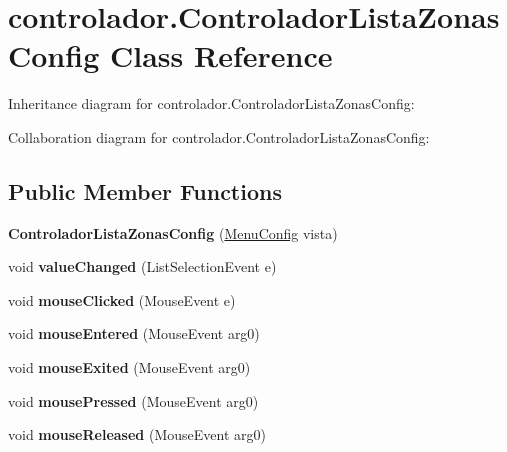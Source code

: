 \hypertarget{classcontrolador_1_1_controlador_lista_zonas_config}{}\section{controlador.\+Controlador\+Lista\+Zonas\+Config Class Reference}
\label{classcontrolador_1_1_controlador_lista_zonas_config}


Inheritance diagram for controlador.\+Controlador\+Lista\+Zonas\+Config\+:


Collaboration diagram for controlador.\+Controlador\+Lista\+Zonas\+Config\+:
\subsection*{Public Member Functions}
\begin{DoxyCompactItemize}
\item 
\mbox{\label{classcontrolador_1_1_controlador_lista_zonas_config_acfb911e40132c6189327faa9245c65d1}} 
{\bfseries Controlador\+Lista\+Zonas\+Config} (\mbox{\hyperlink{classvista_1_1_menu_config}{Menu\+Config}} vista)
\item 
\mbox{\label{classcontrolador_1_1_controlador_lista_zonas_config_a287715d558e3480db8c1e8d44dffadc1}} 
void {\bfseries value\+Changed} (List\+Selection\+Event e)
\item 
\mbox{\label{classcontrolador_1_1_controlador_lista_zonas_config_af9773dcae8ecdd67d09d19d35fdedb4d}} 
void {\bfseries mouse\+Clicked} (Mouse\+Event e)
\item 
\mbox{\label{classcontrolador_1_1_controlador_lista_zonas_config_a898fa52ad57e7e6b3d5350815718430d}} 
void {\bfseries mouse\+Entered} (Mouse\+Event arg0)
\item 
\mbox{\label{classcontrolador_1_1_controlador_lista_zonas_config_a423eb2c5ec368f656f37f7b585ac8e23}} 
void {\bfseries mouse\+Exited} (Mouse\+Event arg0)
\item 
\mbox{\label{classcontrolador_1_1_controlador_lista_zonas_config_ad8103d85ca6edb1ac19d3914d4655462}} 
void {\bfseries mouse\+Pressed} (Mouse\+Event arg0)
\item 
\mbox{\label{classcontrolador_1_1_controlador_lista_zonas_config_a34ccbeec87ff186869925224f4877821}} 
void {\bfseries mouse\+Released} (Mouse\+Event arg0)
\end{DoxyCompactItemize}


